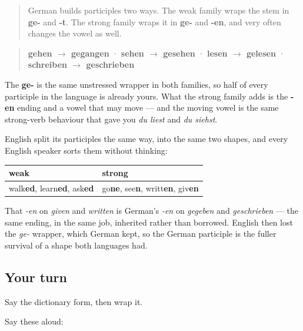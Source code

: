 \begin{grammarlens}[title={Grammar Lens: the second family ends in -en}]
\begin{quote}
German builds participles two ways. The weak family wraps the stem in \textbf{ge-} and \textbf{-t}. The strong family wraps it in \textbf{ge-} and \textbf{-en}, and very often changes the vowel as well.
\end{quote}

\begin{quote}
\textbf{gehen $\to$ gegangen} · \textbf{sehen $\to$ gesehen} · \textbf{lesen $\to$ gelesen} · \textbf{schreiben $\to$ geschrieben}
\end{quote}

The \textbf{ge-} is the same unstressed wrapper in both families, so half of every participle in the language is already yours. What the strong family adds is the \textbf{-en} ending and a vowel that may move — and the moving vowel is the same strong-verb behaviour that gave you \emph{du liest} and \emph{du siehst}.
\end{grammarlens}

\begin{cousinweb}
English split its participles the same way, into the same two shapes, and every English speaker sorts them without thinking:

\noindent
\begin{tabularx}{\linewidth}{@{}>{\raggedright\arraybackslash}X>{\raggedright\arraybackslash}X@{}}
\toprule
\textbf{weak} & \textbf{strong} \\
\midrule
walk\textbf{ed}, learn\textbf{ed}, ask\textbf{ed} & go\textbf{ne}, see\textbf{n}, writt\textbf{en}, giv\textbf{en} \\
\bottomrule
\end{tabularx}

That \emph{-en} on \emph{given} and \emph{written} is German's \emph{-en} on \emph{gegeben} and \emph{geschrieben} — the same ending, in the same job, inherited rather than borrowed. English then lost the \emph{ge-} wrapper, which German kept, so the German participle is the fuller survival of a shape both languages had.
\end{cousinweb}

\subsection*{Your turn}
Say the dictionary form, then wrap it.

Say these aloud:


